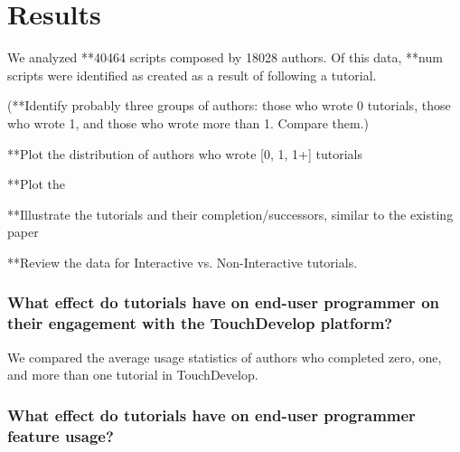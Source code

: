 \section{Results}

We analyzed **40464 scripts composed by 18028 authors. Of this data, **num scripts were identified as created as a result of following a tutorial.

(**Identify probably three groups of authors: those who wrote 0 tutorials, those who wrote 1, and those who wrote more than 1. Compare them.)

**Plot the distribution of authors who wrote [0, 1, 1+] tutorials

**Plot the

**Illustrate the tutorials and their completion/successors, similar to the existing paper

**Review the data for Interactive vs. Non-Interactive tutorials. 

\subsubsection{What effect do tutorials have on end-user programmer on their engagement with the TouchDevelop platform?}

We compared the average usage statistics of authors who completed zero, one, and more than one tutorial in TouchDevelop.

\subsubsection{What effect do tutorials have on end-user programmer feature usage?}





